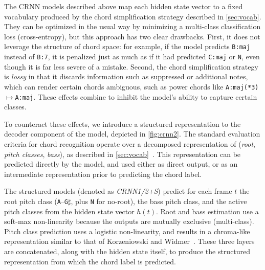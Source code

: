 \documentclass{article}
\begin{document}
The CRNN models described above map each hidden state vector to a fixed vocabulary produced by the chord simplification strategy described in \cref{sec:vocab}.
They can be optimized in the usual way by minimizing a multi-class classification loss (cross-entropy), but this approach has two clear drawbacks.
First, it does not leverage the structure of chord space: for example, if the model predicts \texttt{B:maj} instead of \texttt{B:7}, it is penalized just as much as if it had predicted \texttt{C:maj} or \texttt{N}, even though it is far less severe of a mistake.
Second, the chord simplification strategy is \emph{lossy} in that it discards information such as suppressed or additional notes, which can render certain chords ambiguous, such as power chords like \texttt{A:maj(*3)}$\mapsto$\texttt{A:maj}.
These effects combine to inhibit the model's ability to capture certain classes.

To counteract these effects, we introduce a structured representation to the decoder component of the model, depicted in \cref{fig:crnn2}.
The standard evaluation criteria for chord recognition operate over a decomposed representation of (\emph{root}, \emph{pitch classes}, \emph{bass}), as described in \cref{sec:vocab}~\cite{raffel2014mir_eval}.
This representation can be predicted directly by the model, and used either as direct output, or as an intermediate representation prior to predicting the chord label.

The structured models (denoted as \emph{CRNN1/2+S}) predict for each frame $t$ the root pitch class (\texttt{A}--\texttt{G}$\sharp$, plus \texttt{N} for no-root), the bass pitch class, and the active pitch classes from the hidden state vector $h(t)$.
Root and bass estimation use a soft-max non-linearity because the outputs are mutually exclusive (multi-class).
Pitch class prediction uses a logistic non-linearity, and results in a chroma-like representation similar to that of Korzeniowski and Widmer~\cite{korzeniowski2016feature}.
These three layers are concatenated, along with the hidden state itself, to produce the structured representation from which the chord label is predicted.
\end{document}
